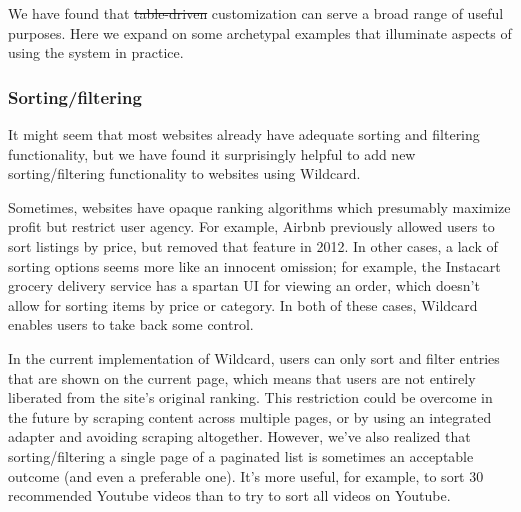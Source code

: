 \documentclass[sigplan,screen,10pt,anonymous,review]{acmart}
\providecommand{\DIFadd}[1]{{\protect\color{blue}\uwave{#1}}} %
\providecommand{\DIFdel}[1]{{\protect\color{red}\sout{#1}}}                      %
\providecommand{\DIFaddbegin}{} %
\providecommand{\DIFaddend}{} %
\providecommand{\DIFdelbegin}{} %
\providecommand{\DIFdelend}{} %
\begin{document}
We have found that \DIFdelbegin \DIFdel{table-driven }\DIFdelend \DIFaddbegin \DIFadd{data-driven }\DIFaddend customization can serve a broad range of
useful purposes. Here we expand on some archetypal examples that
illuminate aspects of using the system in practice.

\hypertarget{sortingfiltering}{%
\subsubsection{Sorting/filtering}\label{sortingfiltering}}

It might seem that most websites already have adequate sorting and
filtering functionality, but we have found it surprisingly helpful to
add new sorting/filtering functionality to websites using Wildcard.

Sometimes, websites have opaque ranking algorithms which presumably
maximize profit but restrict user agency. For example, Airbnb previously
allowed users to sort listings by price, but removed that feature in
2012. In other cases, a lack of sorting options seems more like an
innocent omission; for example, the Instacart grocery delivery service
has a spartan UI for viewing an order, which doesn't allow for sorting
items by price or category. In both of these cases, Wildcard enables
users to take back some control.

In the current implementation of Wildcard, users can only sort and
filter entries that are shown on the current page, which means that
users are not entirely liberated from the site's original ranking. This
restriction could be overcome in the future by scraping content across
multiple pages, or by using an integrated adapter and avoiding scraping
altogether. However, we've also realized that sorting/filtering a single
page of a paginated list is sometimes an acceptable outcome (and even a
preferable one). It's more useful, for example, to sort 30 recommended
Youtube videos than to try to sort all videos on Youtube.
\end{document}
